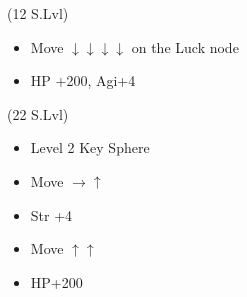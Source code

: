 \begin{spheregrid}
	\begin{itemize}
		\kimahrif (12 S.Lvl)
		\begin{itemize}
			\item Move $\downarrow\downarrow\downarrow\downarrow$ on the Luck node
			\item HP +200, Agi+4
		\end{itemize}
		\tidusf (22 S.Lvl)
		\begin{itemize}
			\item Level 2 Key Sphere
			\item Move $\rightarrow\uparrow$
			\item Str +4
			\item Move $\uparrow\uparrow$
			\item HP+200

\end{itemize}
\end{itemize}
\end{spheregrid}
